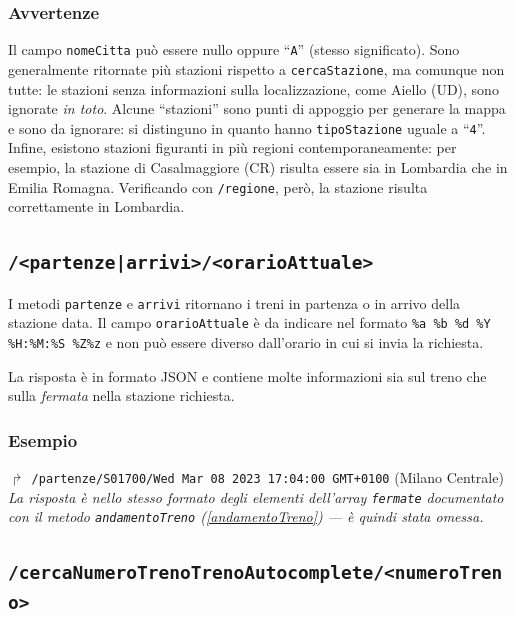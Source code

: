 \documentclass[12pt,a4paper,italian]{report}
\begin{document}
\subsubsection{Avvertenze}

Il campo \texttt{nomeCitta} può essere nullo oppure ``\texttt{A}''
(stesso significato).  Sono generalmente ritornate più stazioni
rispetto a \texttt{cercaStazione}, ma comunque non tutte: le stazioni
senza informazioni sulla localizzazione, come Aiello (UD), sono
ignorate \textit{in toto}.  Alcune ``stazioni'' sono punti di appoggio
per generare la mappa e sono da ignorare: si distinguno in quanto
hanno \texttt{tipoStazione} uguale a ``\texttt{4}''.  Infine, esistono
stazioni figuranti in più regioni contemporaneamente: per esempio, la
stazione di Casalmaggiore (CR) risulta essere sia in Lombardia che in
Emilia Romagna.  Verificando con \texttt{/regione}, però, la stazione
risulta correttamente in Lombardia.

\subsection{\texttt{/<partenze|arrivi>/<orarioAttuale>}}
\label{partenzeArrivi}

I metodi \texttt{partenze} e \texttt{arrivi} ritornano i treni in
partenza o in arrivo della stazione data.  Il campo
\texttt{orarioAttuale} è da indicare nel formato \texttt{\%a \%b \%d
    \%Y \%H:\%M:\%S \%Z\%z} e non può essere diverso dall'orario in
cui si invia la richiesta.

La risposta è in formato JSON e contiene molte informazioni sia sul
treno che sulla \textit{fermata} nella stazione richiesta.

\subsubsection{Esempio}

$\Rsh$ \texttt{/partenze/S01700/Wed Mar 08 2023 17:04:00 GMT+0100}
\hfill (Milano Centrale) \\

\noindent \textit{La risposta è nello stesso formato degli elementi
    dell'array \texttt{fermate} documentato con il metodo
    \texttt{andamentoTreno} (\ref{andamentoTreno}) --- è quindi stata
    omessa.}

\subsection{\texttt{/cercaNumeroTrenoTrenoAutocomplete/<numeroTreno>}}
\label{trenoAutocomplete}
\end{document}
